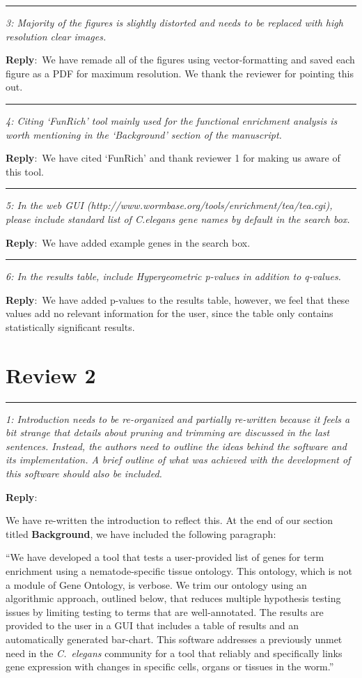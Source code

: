 \documentclass[12pt,stdletter,orderfromtodate,sigleft]{newlfm}
\newcommand{\pointRaised}[2]{\medskip \hrule \noindent 
                \textsl{{\fontseries{b} #1}: #2}}
\newcommand{\reply}{\noindent \textbf{Reply}:\ }
\begin{document}
\begin{newlfm}
\pointRaised{3}{Majority of the figures is slightly distorted and needs to be replaced with high resolution clear images.}

\reply{We have remade all of the figures using vector-formatting and saved each figure as a PDF for maximum resolution. We thank the reviewer for pointing this out.}

\pointRaised{4}{Citing ‘FunRich’ tool mainly used for the functional enrichment analysis is worth mentioning in the ‘Background’ section of the manuscript.
}

\reply{We have cited `FunRich' and thank reviewer 1 for making us aware of this tool.}

\pointRaised{5}{In the web GUI (http://www.wormbase.org/tools/enrichment/tea/tea.cgi), please include standard list of C.elegans gene names by default in the search box.}

\reply{We have added example genes in the search box.
}

\pointRaised{6}{In the results table, include Hypergeometric p-values in addition to q-values.}

\reply{We have added p-values to the results table, however, we feel that these values add no relevant information for the user, since the table only contains statistically significant results.}


\section{Review 2}

\pointRaised{1}{Introduction needs to be re-organized and partially re-written because it feels a bit strange that details about pruning and trimming are discussed in the last sentences. Instead, the authors need to outline the ideas behind the software and its implementation. A brief outline of what was achieved with the development of this software should also be included.}

\reply{We have re-written the introduction to reflect this. At the end of our section titled \textbf{Background}, we have included the following paragraph:

``We have developed a tool that tests a user-provided list of genes for term enrichment using a nematode-specific tissue ontology. This ontology, which is not a module of Gene Ontology, is verbose. We trim our ontology using an algorithmic approach, outlined below, that reduces multiple hypothesis testing issues by limiting testing to terms that are well-annotated. The results are provided to the user in a GUI that includes a table of results and an automatically generated bar-chart. This software addresses a previously unmet need in the \emph{C.~elegans} community for a tool that reliably and specifically links gene expression with changes in specific cells, organs or tissues in the worm.''
}


\end{newlfm}
\end{document}
